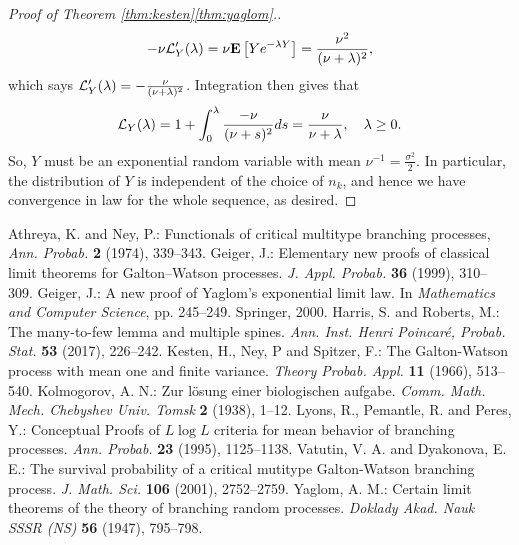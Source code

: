 \documentclass[12pt]{amsart}
\numberwithin{equation}{section}
\newcommand{\brac}[1]{\left[ #1 \right]}
\newcommand{\expct}{\mathbf E}
\begin{document}
\begin{proof}[Proof of Theorem \ref{thm:kesten}\eqref{thm:yaglom}.]
\begin{equation*}
	    -\nu\cL_Y'(\lambda)
	=
	    \nu\expct\brac{Ye^{-\lambda Y}}
    =	
		\frac{\nu^2}{(\nu+\lambda)^2},
\end{equation*}
	which says $\mathcal L_Y'(\lambda)=-\frac{\nu}{(\nu+\lambda)^2}$.
	Integration then gives that
\begin{equation*}
	    \mathcal L_Y(\lambda)
	=
	    1
	+
	    \int_0^\lambda\frac{-\nu}{(\nu+s)^2}ds
	=
		\frac{\nu}{\nu+\lambda},
	\quad
		\lambda \ge 0.
\end{equation*}
	So, $Y$ must be an 	exponential random variable with mean $\nu^{-1}=\frac{\sigma^2}{2}$.
	In particular, the distribution of $Y$ is independent of the choice of $n_k$, and hence we have convergence in law for the whole sequence, as desired.
\end{proof}
\vspace{.1in}
\begin{thebibliography}{99}
	Athreya, K.  and  Ney, P.: 
	Functionals of critical multitype branching processes, 
	{\it Ann. Probab.} 
	{\bf 2} (1974), 339--343.
	Geiger, J.:
	Elementary new proofs of classical limit theorems for Galton--Watson processes.
	{\it J. Appl. Probab.} 
	\textbf{36} (1999), 310--309.
	Geiger, J.:
	A new proof of Yaglom's exponential limit law.
	In {\it Mathematics and Computer Science}, 
	pp. 245--249. Springer, 2000.
	Harris, S. and Roberts, M.:
	The many-to-few lemma and multiple spines.
	{\it Ann.  Inst. Henri Poincar{\'e}, Probab. Stat.}
	\textbf{53} (2017), 226--242.
	Kesten, H.,  Ney, P and Spitzer, F.:
	The Galton-Watson process with mean one and finite variance.
	{\it Theory Probab. Appl.}
	\textbf{11} (1966), 513--540.
	Kolmogorov, A. N.:
	Zur l{\"o}sung einer biologischen aufgabe.
	{\it Comm. Math. Mech. Chebyshev Univ. Tomsk}
	\textbf{2} (1938), 1--12.
	Lyons, R.,  Pemantle, R. and Peres, Y.:
	Conceptual Proofs of $ L \log L $ criteria for mean behavior of branching processes.
	{\it Ann. Probab.} \textbf{23} (1995), 1125--1138.
	Vatutin, V. A. and Dyakonova,  E. E.: 
	The survival probability of a critical mutitype Galton-Watson branching process. 
	{\it J.  Math. Sci.} 
	\textbf{106} (2001), 2752--2759.
	Yaglom, A. M.:
	Certain limit theorems of the theory of branching random processes.
	{\it Doklady Akad. Nauk SSSR (NS)} 
	\textbf{56} (1947), 795--798.
\end{thebibliography}
\end{document}
